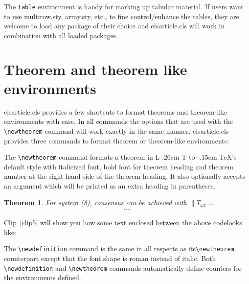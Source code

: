 \documentclass[a4paper,12pt]{article}
\makeatletter
\def\bs{\expandafter\@gobble\string\\}
\def\file#1{\textsf{#1}\xspace}
\DeclareRobustCommand{\LaTeX}{L\kern-.26em%
        {\sbox\z@ T%
         \vbox to\ht\z@{\hbox{\check@mathfonts
           \fontsize\sf@size\z@
           \math@fontsfalse\selectfont
          A\,}%
         \vss}%
        }%
     \kern-.15em%
    \TeX}
\makeatother
\begin{document}
The \verb+table+ environment is handy for marking up tabular
material. If users want to use \file{multirow.sty},
\file{array.sty}, etc., to fine control/enhance the tables, they
are welcome to load any package of their choice and
\file{elsarticle.cls} will work in combination with all loaded
packages.

\section[Theorem and ...]{Theorem and theorem like environments}

\file{elsarticle.cls} provides a few shortcuts to format theorems and
theorem-like environments with ease. In all commands the options that
are used with the \verb+\newtheorem+ command will work exactly in the same
manner. \file{elsarticle.cls} provides three commands to format theorem or
theorem-like environments:

\begin{vquote}
 \newtheorem{thm}{Theorem}
 \newtheorem{lem}[thm]{Lemma}
\end{vquote}

The \verb+\newtheorem+ command formats a
theorem in \LaTeX's default style with italicized font, bold font
for theorem heading and theorem number at the right hand side of the
theorem heading.  It also optionally accepts an argument which
will be printed as an extra heading in parentheses.

\begin{vquote}
  \begin{thm}
   For system (8), consensus can be achieved with
   $\|T_{\omega z}$
   ...
     \begin{eqnarray}\label{10}
     ....
     \end{eqnarray}
  \end{thm}
\end{vquote}

Clip~\ref{clip5} will show you how some text enclosed between the
above code\goodbreak \noindent looks like:

\vspace*{6pt}
\def\rulecolor{blue!70}
\src{{\ttfamily\color{verbcolor}\bs newtheorem}}
\def\rulecolor{orange}

The \verb+\newdefinition+ command is the same in
all respects as its\linebreak \verb+\newtheorem+ counterpart except that
the font shape is roman instead of italic.  Both
\verb+\newdefinition+ and \verb+\newtheorem+ commands
automatically define counters for the environments defined.
\end{document}
